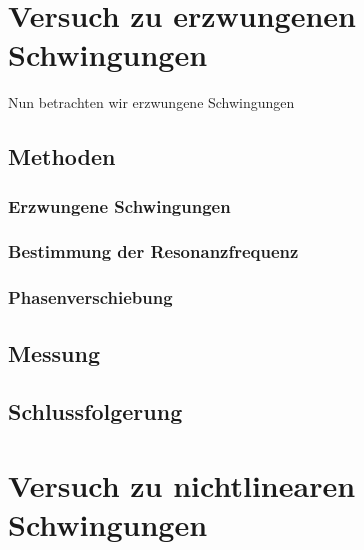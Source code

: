 \documentclass[11pt,a4paper,titlepage, ngerman]{article}
\begin{document}
	\section{Versuch zu erzwungenen Schwingungen}
	
		Nun betrachten wir erzwungene Schwingungen %
			
		\subsection*{Methoden}
			
			\subsubsection*{Erzwungene Schwingungen}
			
				
			\subsubsection*{Bestimmung der Resonanzfrequenz}
			
				
			\subsubsection*{Phasenverschiebung}
			
		
		\subsection*{Messung}
		
			
		\subsection*{Schlussfolgerung}
		
			
	\section{Versuch zu nichtlinearen Schwingungen}
	
\end{document}
